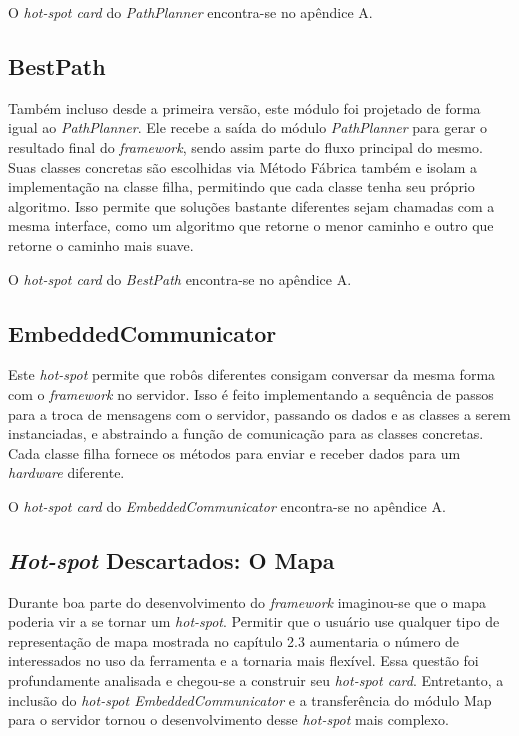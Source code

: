 O \textit{hot-spot card} do \textit{PathPlanner} encontra-se no apêndice A.

\subsection{BestPath}

Também incluso desde a primeira versão, este módulo foi projetado de forma igual ao \textit{PathPlanner}. Ele recebe a saída do módulo \textit{PathPlanner} para gerar o resultado final do \textit{framework}, sendo assim parte do fluxo principal do mesmo. Suas classes concretas são escolhidas via Método Fábrica também e isolam a implementação na classe filha, permitindo que cada classe tenha seu próprio algoritmo. Isso permite que soluções bastante diferentes sejam chamadas com a mesma interface, como um algoritmo que retorne o menor caminho e outro que retorne o caminho mais suave.

O \textit{hot-spot card} do \textit{BestPath} encontra-se no apêndice A.

\subsection{EmbeddedCommunicator}

Este \textit{hot-spot} permite que robôs diferentes consigam conversar da mesma forma com o \textit{framework} no servidor. Isso é feito implementando a sequência de passos para a troca de mensagens com o servidor, passando os dados e as classes a serem instanciadas, e abstraindo a função de comunicação para as classes concretas. Cada classe filha fornece os métodos para enviar e receber dados para um \textit{hardware} diferente.

O \textit{hot-spot card} do \textit{EmbeddedCommunicator} encontra-se no apêndice A.

\subsection{\textit{Hot-spot} Descartados: O Mapa}

Durante boa parte do desenvolvimento do \textit{framework} imaginou-se que o mapa poderia vir a se tornar um \textit{hot-spot}. Permitir que o usuário use qualquer tipo de representação de mapa mostrada no capítulo 2.3 aumentaria o número de interessados no uso da ferramenta e a tornaria mais flexível. Essa questão foi profundamente analisada e chegou-se a construir seu \textit{hot-spot card}. Entretanto, a inclusão do \textit{hot-spot EmbeddedCommunicator} e a transferência do módulo Map para o servidor tornou o desenvolvimento desse \textit{hot-spot} mais complexo. 

